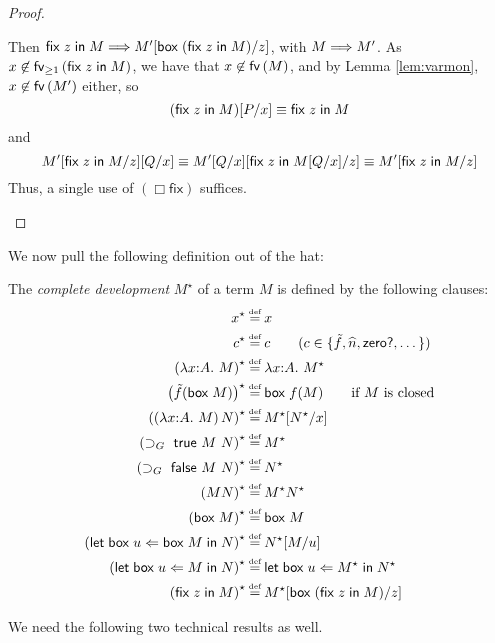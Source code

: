 \begin{proof}
\begin{indproof}
      Then $\mathsf{fix\;} z \mathsf{\;in\;} M \mathrel{\Longrightarrow}{} M'[\mathsf{box\;}(\mathsf{fix\;} z \mathsf{\;in\;} M)/z]$,
      with $M \mathrel{\Longrightarrow}{} M'$. As $x \not\in \mathsf{fv}_{\geq 1}\left(\mathsf{fix\;} z \mathsf{\;in\;} M\right)$, we
      have that $x \not\in \mathsf{fv}\left(M\right)$, and by Lemma
      \ref{lem:varmon}, $x \not\in \mathsf{fv}\left(M'\right)$ either, so \[
        (\mathsf{fix\;} z \mathsf{\;in\;} M)[P/x] \equiv \mathsf{fix\;} z \mathsf{\;in\;} M
      \] and\[
        M'[\mathsf{fix\;} z \mathsf{\;in\;} M/z][Q/x]
          \equiv
        M'[Q/x][\mathsf{fix\;} z \mathsf{\;in\;} M[Q/x]/z]
	  \equiv
	M'[\mathsf{fix\;} z \mathsf{\;in\;} M/z]
      \] Thus, a single use of $(\Box\textsf{fix})$ suffices.
  \end{indproof}
\end{proof}

We now pull the following definition out of the hat:
\begin{defn}
  The \emph{complete development} $M^\star$ of a term $M$ is
  defined by the following clauses:
    \begin{align*}
      x^\star
        &\defeq x \\
      c^\star
        &\defeq c \qquad (c \in 
	  \{\tilde f, \widehat{n},
	    \textsf{zero?}, \dots \}) \\
      \left(\lambda x{:}A.\ M\right)^\star
        &\defeq \lambda x{:}A.\ M^\star \\
      \left(\tilde{f}(\ibox{M})\right)^\star
	&\defeq \ibox{f(M)} \qquad \text{if $M$ is closed} \\
      \left(\left(\lambda x{:}A.\ M\right)N\right)^\star
        &\defeq M^\star[N^\star/x] \\
      \left(\supset_G\ \textsf{true}\ M\ N\right)^\star
        &\defeq M^\star \\
      \left(\supset_G\ \textsf{false}\ M\ N\right)^\star
        &\defeq N^\star \\
      \left(MN\right)^\star
        &\defeq M^\star N^\star \\
      \left(\ibox{M}\right)^\star
        &\defeq \ibox{M} \\
      \left(\letbox{u}{\ibox{M}}{N}\right)^\star
        &\defeq N^\star[M/u] \\
      \left(\letbox{u}{M}{N}\right)^\star
        &\defeq \letbox{u}{M^\star}{N^\star} \\
      \left(\fixlob{z}{M}\right)^\star
        &\defeq M^\star[\ibox{(\fixlob{z}{M})}/z]
    \end{align*}
\end{defn}

\noindent We need the following two technical results as well.

